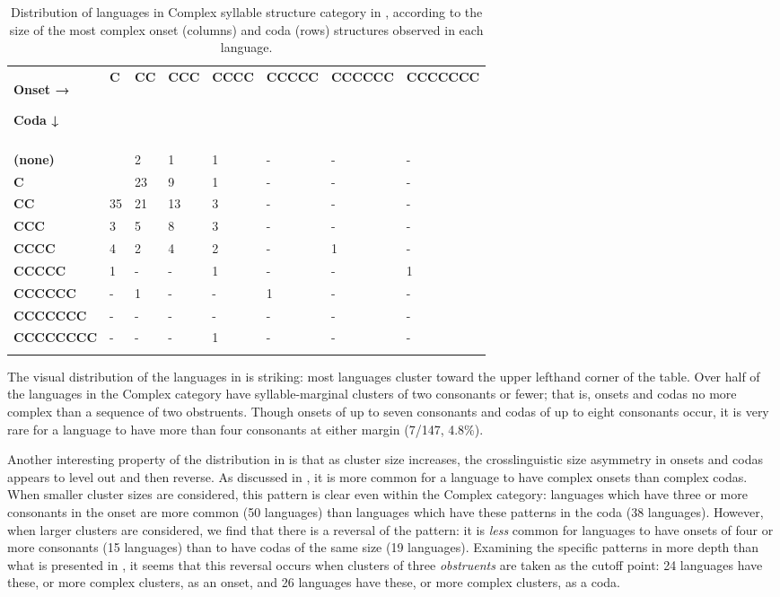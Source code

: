 \begin{table}
\begin{tabularx}{\textwidth}{XXXXXXXX}
\lsptoprule
{ \textbf{Onset →}}

 \textbf{Coda ↓} & \textbf{C} & \textbf{CC} & \textbf{CCC} & \textbf{CCCC} & \textbf{CCCCC} & \textbf{CCCCCC} & \textbf{CCCCCCC}\\
&  &  &  &  &  &  & \\
 \textbf{(none)} &  & 2 & 1 & 1 & - & - & -\\
\hhline{-~------}
 \textbf{C} &  & 23 & 9 & 1 & - & - & -\\
 \textbf{CC} & 35 & 21 & 13 & 3 & - & - & -\\
 \textbf{CCC} & 3 & 5 & 8 & 3 & - & - & -\\
 \textbf{CCCC} & 4 & 2 & 4 & 2 & - & 1 & -\\
 \textbf{CCCCC} & 1 & - & - & 1 & - & - & 1\\
 \textbf{CCCCCC} & - & 1 & - & - & 1 & - & -\\
 \textbf{CCCCCCC} & - & - & - & - & - & - & -\\
 \textbf{CCCCCCCC} & - & - & - & 1 & - & - & -\\
\lspbottomrule
\end{tabularx}
\caption{\label{tab:2.2} Distribution of languages in Complex syllable structure category in \citet{Maddieson2013a}, according to the size of the most complex onset (columns) and coda (rows) structures observed in each language.}
\end{table}

  The visual distribution of the languages in  is striking: most languages cluster toward the upper lefthand corner of the table. Over half of the languages in the Complex category have syllable-marginal clusters of two consonants or fewer; that is, onsets and codas no more complex than a sequence of two obstruents. Though onsets of up to seven consonants and codas of up to eight consonants occur, it is very rare for a language to have more than four consonants at either margin (7/147, 4.8\%).

  Another interesting property of the distribution in  is that as cluster size increases, the crosslinguistic size asymmetry in onsets and codas appears to level out and then reverse. As discussed in , it is more common for a language to have complex onsets than complex codas. When smaller cluster sizes are considered, this pattern is clear even within the Complex category: languages which have three or more consonants in the onset are more common (50 languages) than languages which have these patterns in the coda (38 languages). However, when larger clusters are considered, we find that there is a reversal of the pattern: it is \textit{less} common for languages to have onsets of four or more consonants (15 languages) than to have codas of the same size (19 languages). Examining the specific patterns in more depth than what is presented in , it seems that this reversal occurs when clusters of three \textit{obstruents} are taken as the cutoff point: 24 languages have these, or more complex clusters, as an onset, and 26 languages have these, or more complex clusters, as a coda.

